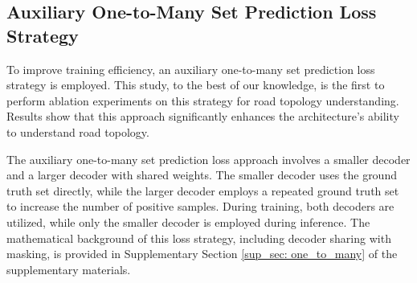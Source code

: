 \subsection{Auxiliary One-to-Many Set Prediction Loss Strategy}
\label{sec: one_to_many_set_prediction_loss_strategy}


To improve training efficiency, an auxiliary one-to-many set prediction loss strategy \cite{jia2023detrs, liao2024maptrv2} is employed. This study, to the best of our knowledge, is the first to perform ablation experiments on this strategy for road topology understanding. Results show that this approach significantly enhances the architecture’s ability to understand road topology.

The auxiliary one-to-many set prediction loss approach involves a smaller decoder and a larger decoder with shared weights. The smaller decoder uses the ground truth set directly, while the larger decoder employs a repeated ground truth set to increase the number of positive samples. During training, both decoders are utilized, while only the smaller decoder is employed during inference. The mathematical background of this loss strategy, including decoder sharing with masking, is provided in Supplementary Section \ref{sup_sec: one_to_many} of the supplementary materials.
